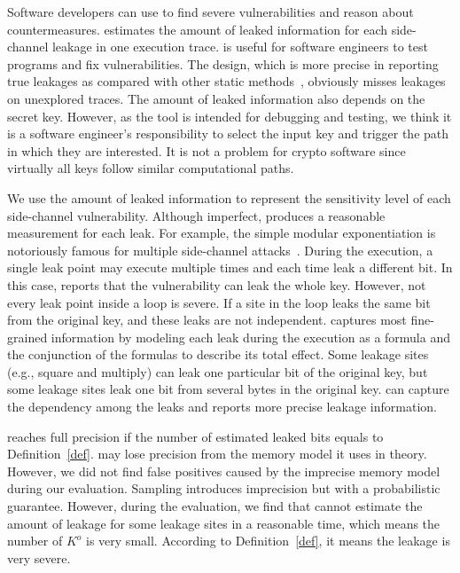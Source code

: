 Software developers can use \tool{} to find severe vulnerabilities
and reason about countermeasures.
\tool{} estimates the amount of leaked information for each side-channel leakage
in one execution trace. \tool{} is useful for software
engineers to test programs and fix vulnerabilities.
The design, which is more precise in reporting true leakages as compared with other static
methods~\cite{197207,BacelarAlmeida:2013:FVS:2483313.2483334}, obviously misses
leakages on unexplored traces. The amount of leaked information also depends on the secret key.
However, as the tool is intended for debugging and testing,
we think it is a software engineer's responsibility to select the input key and trigger
the path in which they are interested. It is not a problem for crypto software
since virtually all keys follow similar computational paths.

We use the amount of leaked information to represent the sensitivity level of
each side-channel vulnerability. Although imperfect, \tool{} produces a reasonable
measurement for each leak. For example, the simple modular exponentiation is
notoriously famous for multiple side-channel attacks~\cite{kocher1996timing}.
During the execution, a single leak point may execute multiple times
and each time leak a different bit. In this case, \tool{} reports that the
vulnerability can leak the whole key. However, not every leak point inside a
loop is severe. If a site in the loop leaks the same bit from the
original key, and these leaks are not independent. \tool{} captures most
fine-grained information by modeling each leak during the execution as a
formula and the conjunction of the formulas to describe its total effect.
Some leakage sites (e.g., square and multiply)
can leak one particular bit of the original key, but some leakage sites leak one bit
from several bytes in the original key. \tool{} can capture the dependency among the leaks and
reports more precise leakage information.

\tool{} reaches full precision if the number of estimated leaked bits
equals to Definition~\ref{def}.
\tool{} may lose precision from the
memory model it uses in theory. However, we did not find false positives
caused by the imprecise memory model during our evaluation.
Sampling introduces imprecision but with a probabilistic guarantee.
However, during the evaluation, we find that \tool{} cannot estimate
the amount of leakage for some leakage sites in a reasonable time,
which means the number of $K^o$ is very small. According to Definition~\ref{def}, it means the leakage is very severe. 